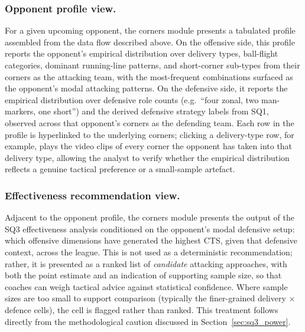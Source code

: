 \subsubsection{Opponent profile view.}
For a given upcoming opponent, the corners module presents a tabulated
profile assembled from the data flow described above. On the offensive
side, this profile reports the opponent's empirical distribution over
delivery types, ball-flight categories, dominant running-line patterns,
and short-corner sub-types from their corners as the attacking team, with
the most-frequent combinations surfaced as the opponent's modal
attacking patterns. On the defensive side, it reports the empirical
distribution over defensive role counts (e.g.\ ``four zonal, two
man-markers, one short'') and the derived defensive strategy labels from
SQ1, observed across that opponent's corners as the defending team. Each
row in the profile is hyperlinked to the underlying corners; clicking a
delivery-type row, for example, plays the video clips of every corner the
opponent has taken into that delivery type, allowing the analyst to
verify whether the empirical distribution reflects a genuine tactical
preference or a small-sample artefact.

\subsubsection{Effectiveness recommendation view.}
Adjacent to the opponent profile, the corners module presents the
output of the SQ3 effectiveness analysis conditioned on the opponent's
modal defensive setup: which offensive dimensions have generated the
highest CTS, given that defensive context, across the league. This is
not used as a deterministic recommendation; rather, it is presented as a
ranked list of \textit{candidate} attacking approaches, with both the
point estimate and an indication of supporting sample size, so that
coaches can weigh tactical advice against statistical confidence. Where
sample sizes are too small to support comparison (typically the
finer-grained delivery $\times$ defence cells), the cell is flagged
rather than ranked. This treatment follows directly from the
methodological caution discussed in Section~\ref{sec:sq3_power}.

